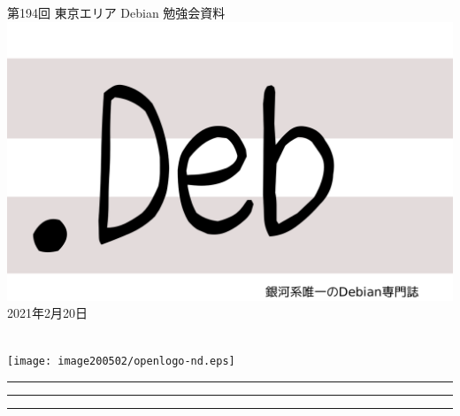 \documentclass[mingoth,a4paper]{jsarticle}
\newcommand{\debmtgyear}{2021}
\newcommand{\debmtgmonth}{2}
\newcommand{\debmtgdate}{20}
\newcommand{\debmtgnumber}{194}
\begin{document}
\begin{titlepage}
\thispagestyle{empty}

\vspace*{-2cm}
第\debmtgnumber{}回 東京エリア Debian 勉強会資料\\
\hspace*{-2cm}
\includegraphics{image2012-natsu/dotdeb.pdf}\\
\hfill{}\debmtgyear{}年\debmtgmonth{}月\debmtgdate{}日

\\

\vspace*{-2cm}
\hfill{}\texttt{[image: image200502/openlogo-nd.eps]}
\end{titlepage}

\newpage

\begin{minipage}[b]{0.2\hsize}
 \colorbox{titleback}{}
\end{minipage}
\begin{minipage}[b]{0.8\hsize}
\hrule
\vspace{2mm}
\hrule
\begin{multicols}{2}
\tableofcontents
\end{multicols}
\vspace{2mm}
\hrule
\end{minipage}

\end{document}
